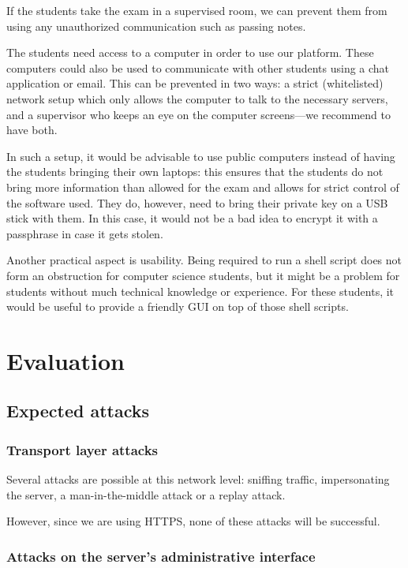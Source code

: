 \documentclass[12pt]{article}
\begin{document}
If the students take the exam in a supervised room, we can prevent them from
using any unauthorized communication such as passing notes.

The students need access to a computer in order to use our platform. These
computers could also be used to communicate with other students using a chat
application or email. This can be prevented in two ways: a strict (whitelisted)
network setup which only allows the computer to talk to the necessary servers,
and a supervisor who keeps an eye on the computer screens---we recommend to have
both.

In such a setup, it would be advisable to use public computers instead of having
the students bringing their own laptops: this ensures that the students do not
bring more information than allowed for the exam and allows for strict control
of the software used. They do, however, need to bring their private key on a USB
stick with them. In this case, it would not be a bad idea to encrypt it with a
passphrase in case it gets stolen.

Another practical aspect is usability. Being required to run a shell script does
not form an obstruction for computer science students, but it might be a problem
for students without much technical knowledge or experience. For these students,
it would be useful to provide a friendly GUI on top of those shell scripts.

\section{Evaluation}
\subsection{Expected attacks}
\label{subsec:req-attacks}

\subsubsection{Transport layer attacks}

Several attacks are possible at this network level: sniffing traffic,
impersonating the server, a man-in-the-middle attack or a replay attack.

However, since we are using HTTPS, none of these attacks will be successful.

\subsubsection{Attacks on the server's administrative interface}
\end{document}
